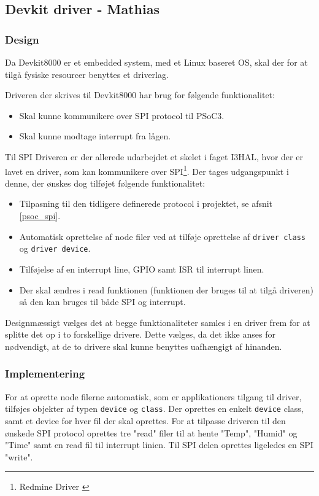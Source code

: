 \subsection{Devkit driver - Mathias}
\subsubsection{Design}

Da Devkit8000 er et embedded system, med et Linux baseret OS, skal der for at tilgå fysiske resourcer benyttes et driverlag. 

Driveren der skrives til Devkit8000 har brug for følgende funktionalitet:

\begin{itemize}
  \item Skal kunne kommunikere over SPI protocol til PSoC3.
  \item Skal kunne modtage interrupt fra lågen.
\end{itemize}

Til SPI Driveren er der allerede udarbejdet et skelet i faget I3HAL, hvor der er lavet en driver, som kan kommunikere over SPI\footnote{Redmine Driver \cite{redmine_driver}}. Der tages udgangspunkt i denne, der ønskes dog tilføjet følgende funktionalitet:

\begin{itemize}
  \item Tilpasning til den tidligere definerede protocol i projektet, se afsnit \ref{psoc_spi}.
  \item Automatisk oprettelse af node filer ved at tilføje oprettelse af \texttt{driver class} og \texttt{driver device}.
  \item Tilføjelse af en interrupt line, GPIO samt ISR til interrupt linen. 
  \item Der skal ændres i read funktionen (funktionen der bruges til at tilgå driveren) så den kan bruges til både SPI og interrupt.
\end{itemize}

Designmæssigt vælges det at begge funktionaliteter samles i en driver frem for at splitte det op i to forskellige drivere. Dette vælges, da det ikke anses for nødvendigt, at de to drivere skal kunne benyttes uafhængigt af hinanden.

\subsubsection{Implementering}

For at oprette node filerne automatisk, som er applikationers tilgang til driver, tilføjes objekter af typen \texttt{device} og \texttt{class}. Der oprettes en enkelt \texttt{device} class, samt et device for hver fil der skal oprettes. For at tilpasse driveren til den ønskede SPI protocol oprettes tre "read" filer til at hente "Temp", "Humid"  og "Time"  samt en read fil til interrupt linien. Til SPI delen oprettes ligeledes en SPI "write". 

